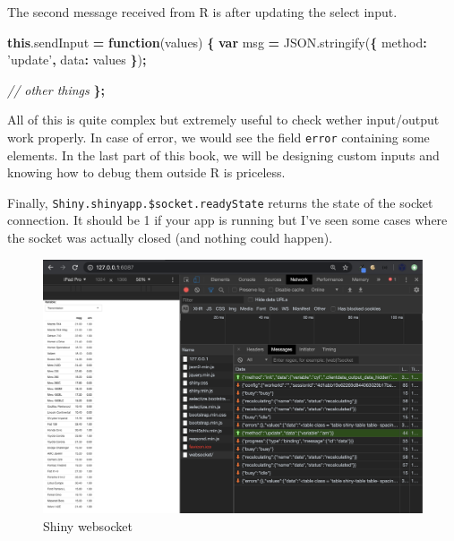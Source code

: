 \documentclass[]{book}
\newenvironment{Shaded}{\begin{snugshade}}{\end{snugshade}}
\newcommand{\AttributeTok}[1]{\textcolor[rgb]{0.77,0.63,0.00}{#1}}
\newcommand{\CommentTok}[1]{\textcolor[rgb]{0.56,0.35,0.01}{\textit{#1}}}
\newcommand{\DataTypeTok}[1]{\textcolor[rgb]{0.13,0.29,0.53}{#1}}
\newcommand{\KeywordTok}[1]{\textcolor[rgb]{0.13,0.29,0.53}{\textbf{#1}}}
\newcommand{\NormalTok}[1]{#1}
\newcommand{\OperatorTok}[1]{\textcolor[rgb]{0.81,0.36,0.00}{\textbf{#1}}}
\newcommand{\StringTok}[1]{\textcolor[rgb]{0.31,0.60,0.02}{#1}}
\newcommand{\VariableTok}[1]{\textcolor[rgb]{0.00,0.00,0.00}{#1}}
\begin{document}
The second message received from R is after updating the select input.

\begin{Shaded}
\begin{Highlighting}[]
\KeywordTok{this}\NormalTok{.}\AttributeTok{sendInput} \OperatorTok{=} \KeywordTok{function}\NormalTok{(values) }\OperatorTok{\{}
\KeywordTok{var}\NormalTok{ msg }\OperatorTok{=} \VariableTok{JSON}\NormalTok{.}\AttributeTok{stringify}\NormalTok{(}\OperatorTok{\{}
\DataTypeTok{method}\OperatorTok{:} \StringTok{'update'}\OperatorTok{,}
\DataTypeTok{data}\OperatorTok{:}\NormalTok{ values}
\OperatorTok{\}}\NormalTok{)}\OperatorTok{;}

\CommentTok{// other things}
\OperatorTok{\};}
\end{Highlighting}
\end{Shaded}

All of this is quite complex but extremely useful to check wether input/output work properly. In case of error, we would see the field \texttt{error} containing some elements. In the last part of this book, we will be designing custom inputs and knowing how to debug them outside R is priceless.

Finally, \texttt{Shiny.shinyapp.\$socket.readyState} returns the state of the socket connection. It should be 1 if your app is running but I've seen some cases where the socket was actually closed (and nothing could happen).

\begin{figure}
\includegraphics[width=27.69in]{images/survival-kit/shiny-websocket} \caption{Shiny websocket}\label{fig:shiny-websocket}
\end{figure}
\end{document}
